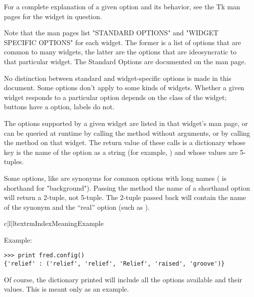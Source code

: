 For a complete explanation of a given option and its behavior, see the
Tk man pages for the widget in question.

Note that the man pages list "STANDARD OPTIONS" and "WIDGET SPECIFIC
OPTIONS" for each widget.  The former is a list of options that are
common to many widgets, the latter are the options that are
ideosyncratic to that particular widget.  The Standard Options are
documented on the  man page.

No distinction between standard and widget-specific options is made in
this document.  Some options don't apply to some kinds of widgets.
Whether a given widget responds to a particular option depends on the
class of the widget; buttons have a  option, labels do not. 

The options supported by a given widget are listed in that widget's
man page, or can be queried at runtime by calling the
 method without arguments, or by calling the
 method on that widget.  The return value of these
calls is a dictionary whose key is the name of the option as a string
(for example, ) and whose values are 5-tuples.

Some options, like  are synonyms for common options with long
names ( is shorthand for "background"). Passing the
 method the name of a shorthand option will return a
2-tuple, not 5-tuple. The 2-tuple passed back will contain the name of
the synonym and the ``real'' option (such as ).

\begin{tableiii}{c|l|l}{textrm}{Index}{Meaning}{Example}
                         {}
     {}
    {}
                       {}
                       {}
\end{tableiii}


Example:

\begin{verbatim}
>>> print fred.config()
{'relief' : ('relief', 'relief', 'Relief', 'raised', 'groove')}
\end{verbatim}

Of course, the dictionary printed will include all the options
available and their values.  This is meant only as an example.


